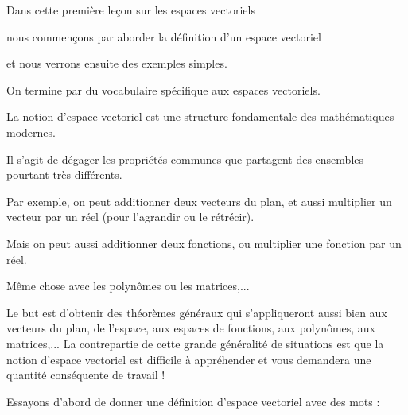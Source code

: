 







\debuttexte


\diapo

\change

Dans cette première leçon sur les espaces vectoriels

\change

nous commençons par aborder la définition d'un espace vectoriel

\change

et nous verrons ensuite des exemples simples.

\change

On termine par du vocabulaire spécifique aux espaces vectoriels.


\diapo

La notion d'espace vectoriel est une structure fondamentale des mathématiques modernes.

\change

Il s'agit de dégager les propriétés communes que partagent des ensembles pourtant très différents.

\change

Par exemple, on peut additionner deux vecteurs du plan, et aussi multiplier un vecteur par un réel 
(pour l'agrandir ou le rétrécir). 

\change

Mais on peut aussi additionner deux fonctions, ou multiplier une fonction
par un réel. 

\change

Même chose avec les polynômes ou les matrices,...

\change

Le  but est d'obtenir des théorèmes généraux qui s'appliqueront aussi bien aux vecteurs du plan, 
de l'espace, aux espaces de fonctions, aux polynômes, aux matrices,...
La contrepartie de cette grande généralité de situations est que la notion 
d'espace vectoriel est difficile à appréhender et vous demandera une quantité conséquente de travail !

\diapo

Essayons d'abord de donner une définition d'espace vectoriel avec des mots :

